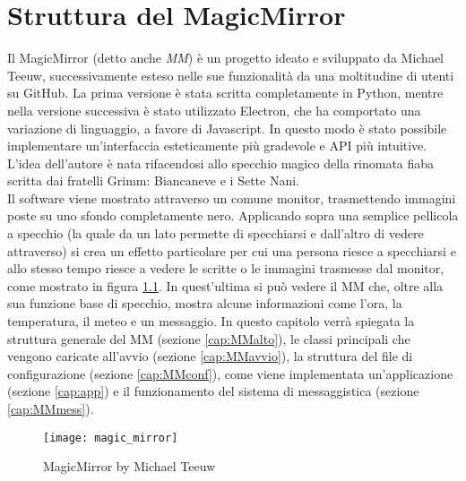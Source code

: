 \chapter{Struttura del MagicMirror}\label{capitolo3}
Il MagicMirror (detto anche \emph{MM}) \`e un progetto ideato e sviluppato da Michael Teeuw, successivamente esteso nelle sue
funzionalit\`a da una moltitudine di utenti su GitHub.
La prima versione \`e stata scritta completamente in Python, mentre nella versione successiva \`e stato utilizzato Electron,
che ha comportato una variazione di linguaggio, a favore di Javascript. In questo modo \`e stato possibile implementare un'interfaccia esteticamente pi\`u gradevole
e API pi\`u intuitive.
L'idea dell'autore \`e nata rifacendosi allo specchio magico della rinomata fiaba
scritta dai fratelli Grimm: Biancaneve e i Sette Nani.\\
Il software viene mostrato attraverso un
comune monitor, trasmettendo immagini poste su uno sfondo completamente nero. Applicando sopra
una semplice pellicola a specchio (la quale da un lato permette di specchiarsi e dall'altro di vedere
attraverso) si crea un effetto particolare per cui una persona riesce a specchiarsi
e allo stesso tempo riesce a vedere le scritte o le immagini trasmesse dal monitor,
come mostrato in figura \ref{fig:MM}. In quest'ultima si pu\`o vedere il MM
che, oltre alla sua funzione base di specchio, mostra alcune informazioni come l'ora, la temperatura, il meteo e un messaggio.
In questo capitolo verr\`a spiegata la struttura generale del MM (sezione \ref{cap:MMalto}), le classi principali che vengono caricate
all'avvio (sezione \ref{cap:MMavvio}), la struttura del file di configurazione (sezione \ref{cap:MMconf}),
come viene implementata un'applicazione (sezione \ref{cap:app})
e il funzionamento del sistema di messaggistica (sezione \ref{cap:MMmess}).\\[2\baselineskip]
\begin{figure}[H]
    \texttt{[image: magic\_mirror]}
    \caption{MagicMirror by Michael Teeuw}
    \label{fig:MM}
\end{figure}


